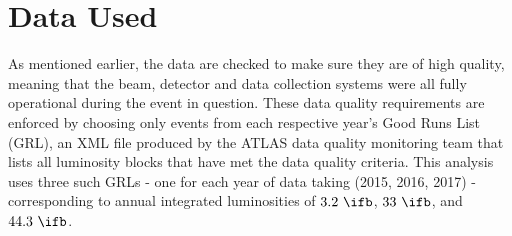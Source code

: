 \section{Data Used} \label{sec:data:data}

As mentioned earlier, the data are checked to make sure they are of high
quality, meaning that the beam, detector and data collection systems were all
fully operational during the event in question. These data quality requirements
are enforced by choosing only events from each respective year's Good Runs List
(GRL), an XML file produced by the ATLAS data quality monitoring team that
lists all luminosity blocks that have met the data quality criteria.  This
analysis uses three such GRLs - one for each year of data taking
(2015, 2016, 2017) - corresponding to annual integrated luminosities of
$3.2~\ifb$, $33~\ifb$, and $44.3~\ifb$.
